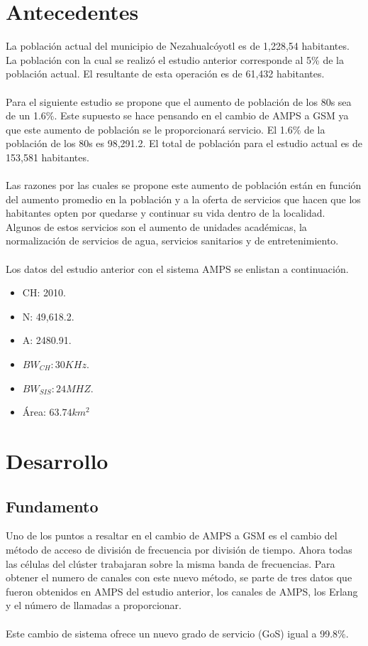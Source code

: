 \documentclass[11pt,letterpaper]{article}
\begin{document}


\newpage
\tableofcontents
\listoffigures
\listoftables

\newpage
\section{Antecedentes}
La población actual del municipio de Nezahualcóyotl es de 1,228,54 habitantes.
La población con la cual se realizó el estudio anterior corresponde al 5\% de 
la población actual. El resultante de esta operación es de 61,432 habitantes. 
\\ \\
Para el siguiente estudio se propone que el aumento de población de los 80s 
sea de un 1.6\%. Este supuesto se hace pensando en el cambio de AMPS a GSM ya 
que este aumento de población se le proporcionará servicio. El 1.6\% de la 
población de los 80s es 98,291.2. El total de población para el estudio actual 
es de 153,581 habitantes.
\\ \\
Las razones por las cuales se propone este aumento de población están en función 
del aumento promedio en la población y a la oferta de servicios que hacen que los 
habitantes opten por quedarse y continuar su vida dentro de la localidad. Algunos 
de estos servicios son el aumento de unidades académicas, la normalización de 
servicios de agua, servicios sanitarios y de entretenimiento. 
\\ \\
Los datos del estudio anterior con el sistema AMPS se enlistan a continuación.
\begin{itemize}
    \item CH: 2010.
    \item N: 49,618.2.
    \item A: 2480.91.
    \item $BW_{CH}:30KHz$.
    \item $BW_{SIS}:24MHZ$.
    \item Área: $63.74km^2$
\end{itemize}

\section{Desarrollo}
\subsection{Fundamento}
Uno de los puntos a resaltar en el cambio de AMPS a GSM es el cambio del 
método de acceso de división de frecuencia por división de tiempo. Ahora todas 
las células del clúster trabajaran sobre la misma banda de frecuencias. Para 
obtener el numero de canales con este nuevo método, se parte de tres datos 
que fueron obtenidos en AMPS del estudio anterior, los canales de AMPS, los 
Erlang y el número de llamadas a proporcionar.
\\ \\
Este cambio de sistema ofrece un nuevo grado de servicio (GoS) igual a 99.8\%.
\end{document}
